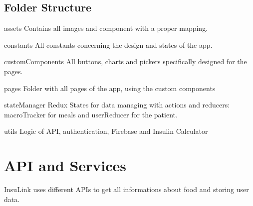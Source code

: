 \documentclass[12pt,hidelinks]{article}
\begin{document}
	\subsection{Folder Structure}
	\begin{docCommand}{assets}{}
		Contains all images and component with a proper mapping.
	\end{docCommand}

	\begin{docCommand}{constants}{}
		All constants concerning the design and states of the app.
	\end{docCommand}

	\begin{docCommand}{customComponents}{}
		All buttons, charts and pickers specifically designed for the pages.
	\end{docCommand}

	\begin{docCommand}{pages}{}
		Folder with all pages of the app, using the custom components
	\end{docCommand}

	\begin{docCommand}{stateManager}{}
		Redux States for data managing with actions and reducers: macroTracker for meals and userReducer for the patient.
	\end{docCommand}

	\begin{docCommand}{utils}{}
		Logic of API, authentication, Firebase and Insulin Calculator
	\end{docCommand}




\newpage
\section{API and Services}	
\vspace{10.5cm}	
InsuLink uses different APIs to get all informations about food and storing user data.
\end{document}
